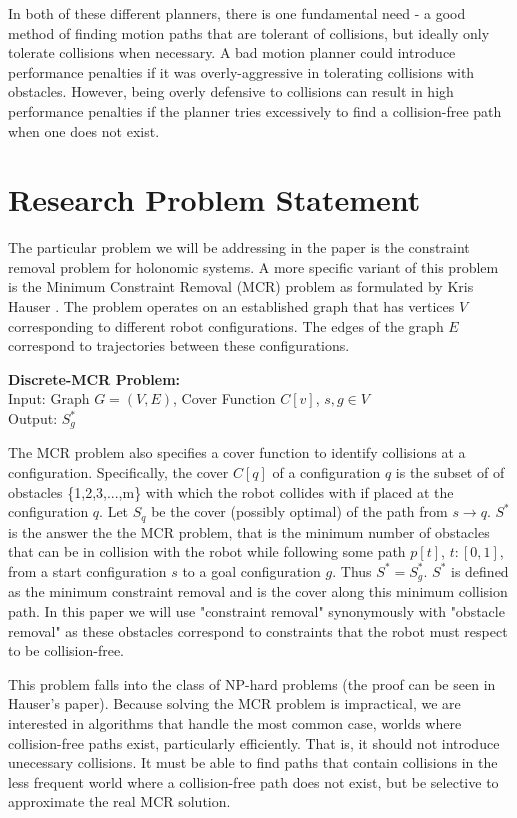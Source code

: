 In both of these different planners, there is one fundamental need - a good method of finding motion paths that are tolerant of collisions, but ideally only tolerate collisions when necessary. A bad motion planner could introduce performance penalties if it was overly-aggressive in tolerating collisions with obstacles. However, being overly defensive to collisions can result in high performance penalties if the planner tries excessively to find a collision-free path when one does not exist. 

\section{Research Problem Statement} \label{intro:statement}
The particular problem we will be addressing in the paper is the constraint removal problem for holonomic systems. A more specific variant of this problem is the Minimum Constraint Removal (MCR) problem as formulated by Kris Hauser \cite{hauser:mcr}. The problem operates on an established graph that has vertices $V$ corresponding to different robot configurations. The edges of the graph $E$ correspond to trajectories between these configurations. 
\newline

\noindent
{\bf{Discrete-MCR Problem:}}\\
Input: Graph $G = (V,E)$, Cover Function $C[v]$, $s,g \in V$  \\
Output: $S^{*}_g$
\newline

The MCR problem also specifies a cover function to identify collisions at a configuration. Specifically, the cover $C[q]$ of a configuration $q$ is the subset of of obstacles \{1,2,3,...,m\} with which the robot collides with if placed at the configuration $q$. Let $S_q$ be the cover (possibly optimal) of the path from $s \rightarrow q$. $S^{*}$ is the answer the the MCR problem, that is the minimum number of obstacles that can be in collision with the robot while following some path $p[t]$, $t:[0,1]$, from a start configuration $s$ to a goal configuration $g$. Thus $S^{*} = S^{*}_g$. $S^{*}$ is defined as the minimum constraint removal and is the cover along this minimum collision path. In this paper we will use "constraint removal" synonymously with "obstacle removal" as these obstacles correspond to constraints that the robot must respect to be collision-free.

This problem falls into the class of NP-hard problems (the proof can be seen in Hauser's paper). Because solving the MCR problem is impractical, we are interested in algorithms that handle the most common case, worlds where collision-free paths exist, particularly efficiently. That is, it should not introduce unecessary collisions. It must be able to find paths that contain collisions in the less frequent world where a collision-free path does not exist, but be selective to approximate the real MCR solution.

